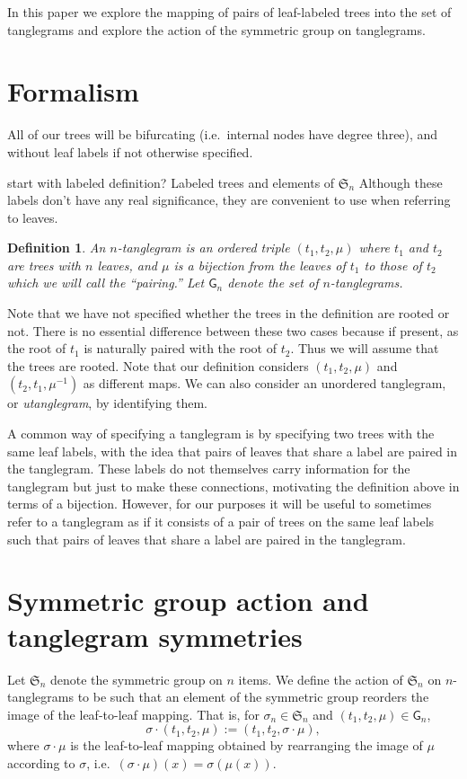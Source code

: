 \documentclass{amsart}
\newtheorem{definition}[theorem]{Definition}
\newcommand{\fS}{\mathfrak S}
\newcommand{\pairing}{\mu}
\newcommand{\tangle}{\mathsf{G}}
\begin{document}
In this paper we explore the mapping of pairs of leaf-labeled trees into the set of tanglegrams and explore the action of the symmetric group on tanglegrams.


\section{Formalism}
All of our trees will be bifurcating (i.e.\ internal nodes have degree three), and without leaf labels if not otherwise specified.

start with labeled definition?
Labeled trees and elements of $\fS_n$
Although these labels don't have any real significance, they are convenient to use when referring to leaves.

\begin{definition}
\label{def:tanglegram}
An $n$-\emph{tanglegram} is an ordered triple $(t_1, t_2, \pairing)$ where $t_1$ and $t_2$ are trees with $n$ leaves, and $\pairing$ is a bijection from the leaves of $t_1$ to those of $t_2$ which we will call the ``pairing.''
Let $\tangle_n$ denote the set of $n$-tanglegrams.
\end{definition}
Note that we have not specified whether the trees in the definition are rooted or not.
There is no essential difference between these two cases because if present, as the root of $t_1$ is naturally paired with the root of $t_2$.
Thus we will assume that the trees are rooted.
Note that our definition considers $(t_1, t_2, \pairing)$ and $(t_2, t_1, \pairing^{-1})$ as different maps.
We can also consider an unordered tanglegram, or \emph{utanglegram}, by identifying them.

A common way of specifying a tanglegram is by specifying two trees with the same leaf labels, with the idea that pairs of leaves that share a label are paired in the tanglegram.
These labels do not themselves carry information for the tanglegram but just to make these connections, motivating the definition above in terms of a bijection.
However, for our purposes it will be useful to sometimes refer to a tanglegram as if it consists of a pair of trees on the same leaf labels such that pairs of leaves that share a label are paired in the tanglegram.


\section{Symmetric group action and tanglegram symmetries}
Let $\fS_n$ denote the symmetric group on $n$ items.
We define the action of $\fS_n$ on $n$-tanglegrams to be such that an element of the symmetric group reorders the image of the leaf-to-leaf mapping.
That is, for $\sigma_n \in \fS_n$ and $(t_1, t_2, \pairing) \in \tangle_n$,
\[
\sigma \cdot (t_1, t_2, \pairing) := (t_1, t_2, \sigma \cdot \pairing),
\]
where $\sigma \cdot \pairing$ is the leaf-to-leaf mapping obtained by rearranging the image of $\pairing$ according to $\sigma$, i.e.\ $(\sigma \cdot \pairing)(x) = \sigma(\pairing(x))$.
\end{document}
